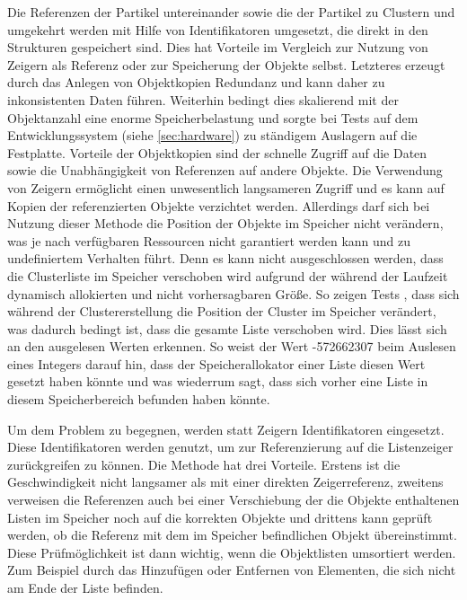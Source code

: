 Die Referenzen der Partikel untereinander sowie die der Partikel zu Clustern und umgekehrt werden mit Hilfe von Identifikatoren umgesetzt, die direkt in den Strukturen gespeichert sind. Dies hat Vorteile im Vergleich zur Nutzung von Zeigern als Referenz oder zur Speicherung der Objekte selbst. Letzteres erzeugt durch das Anlegen von Objektkopien Redundanz und kann daher zu inkonsistenten Daten führen. Weiterhin bedingt dies skalierend mit der Objektanzahl eine enorme Speicherbelastung und sorgte bei Tests auf dem Entwicklungssystem (siehe \autoref{sec:hardware}) zu ständigem Auslagern auf die Festplatte. Vorteile der Objektkopien sind der schnelle Zugriff auf die Daten sowie die Unabhängigkeit von Referenzen auf andere Objekte.
Die Verwendung von Zeigern ermöglicht einen unwesentlich langsameren Zugriff und es kann auf Kopien der referenzierten Objekte verzichtet werden. Allerdings darf sich bei Nutzung dieser Methode die Position der Objekte im Speicher nicht verändern, was je nach verfügbaren Ressourcen nicht garantiert werden kann und zu undefiniertem Verhalten führt. Denn es kann nicht ausgeschlossen werden, dass die Clusterliste im Speicher verschoben wird aufgrund der während der Laufzeit dynamisch allokierten und nicht vorhersagbaren Größe. So zeigen Tests %
, dass sich während der Clustererstellung die Position der Cluster im Speicher verändert, was dadurch bedingt ist, dass die gesamte Liste verschoben wird. Dies lässt sich an den ausgelesen Werten erkennen. So weist der Wert -572662307 beim Auslesen eines Integers darauf hin, dass der Speicherallokator einer Liste diesen Wert gesetzt haben könnte und was wiederrum sagt, dass sich vorher eine Liste in diesem Speicherbereich befunden haben könnte.

Um dem Problem zu begegnen, werden statt Zeigern Identifikatoren eingesetzt. %
Diese Identifikatoren werden genutzt, um zur Referenzierung auf die Listenzeiger zurückgreifen zu können. Die Methode hat drei Vorteile. Erstens ist die Geschwindigkeit nicht langsamer als mit einer direkten Zeigerreferenz, zweitens verweisen die Referenzen auch bei einer Verschiebung der die Objekte enthaltenen Listen im Speicher noch auf die korrekten Objekte und drittens kann geprüft werden, ob die Referenz mit dem im Speicher befindlichen Objekt übereinstimmt. Diese Prüfmöglichkeit ist dann wichtig, wenn die Objektlisten umsortiert werden. Zum Beispiel durch das Hinzufügen oder Entfernen von Elementen, die sich nicht am Ende der Liste befinden.


